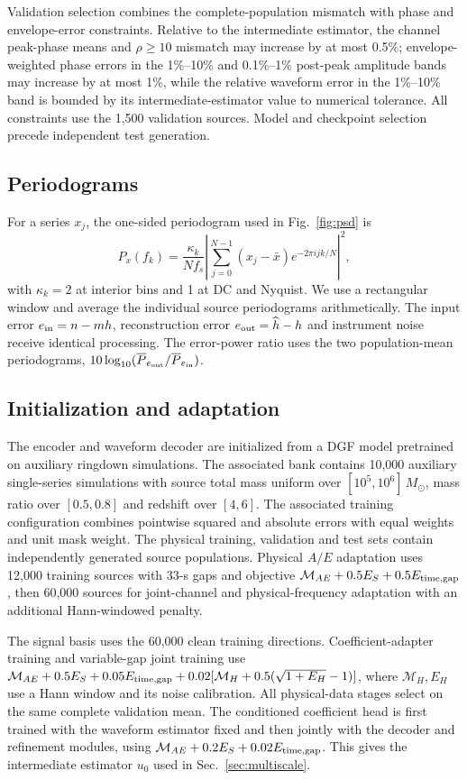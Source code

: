 \documentclass[10pt,prd,aps,a4paper,twocolumn,superscriptaddress,nofootinbib,floatfix]{revtex4-2}
\begin{document}
Validation selection combines the complete-population mismatch with phase and envelope-error constraints. Relative to the intermediate estimator, the channel peak-phase means and $\rho\ge10$ mismatch may increase by at most 0.5\%; envelope-weighted phase errors in the 1\%--10\% and 0.1\%--1\% post-peak amplitude bands may increase by at most 1\%, while the relative waveform error in the 1\%--10\% band is bounded by its intermediate-estimator value to numerical tolerance. All constraints use the 1,500 validation sources. Model and checkpoint selection precede independent test generation.

\subsection{Periodograms}
For a series $x_j$, the one-sided periodogram used in Fig.~\ref{fig:psd} is
\begin{equation}
P_x(f_k)=\frac{\kappa_k}{Nf_s}\left|\sum_{j=0}^{N-1}(x_j-\bar x)e^{-2\pi i jk/N}\right|^2,
\end{equation}
with $\kappa_k=2$ at interior bins and 1 at DC and Nyquist. We use a rectangular window and average the individual source periodograms arithmetically. The input error $e_{\rm in}=n-mh$, reconstruction error $e_{\rm out}=\widehat h-h$ and instrument noise receive identical processing. The error-power ratio uses the two population-mean periodograms, $10\log_{10}(\overline P_{e_{\rm out}}/\overline P_{e_{\rm in}})$.

\subsection{Initialization and adaptation}\label{app:initialization}
The encoder and waveform decoder are initialized from a DGF model pretrained on auxiliary ringdown simulations. The associated bank contains 10,000 auxiliary single-series simulations with source total mass uniform over $[10^5,10^6]\,M_\odot$, mass ratio over $[0.5,0.8]$ and redshift over $[4,6]$. The associated training configuration combines pointwise squared and absolute errors with equal weights and unit mask weight. The physical training, validation and test sets contain independently generated source populations. Physical $A/E$ adaptation uses 12,000 training sources with 33-s gaps and objective $\mathcal M_{AE}+0.5E_S+0.5E_{\rm time,gap}$, then 60,000 sources for joint-channel and physical-frequency adaptation with an additional Hann-windowed penalty.

The signal basis uses the 60,000 clean training directions. Coefficient-adapter training and variable-gap joint training use $\mathcal M_{AE}+0.5E_S+0.05E_{\rm time,gap}+0.02[\mathcal M_H+0.5(\sqrt{1+E_H}-1)]$, where $\mathcal M_H,E_H$ use a Hann window and its noise calibration. All physical-data stages select on the same complete validation mean. The conditioned coefficient head is first trained with the waveform estimator fixed and then jointly with the decoder and refinement modules, using $\mathcal M_{AE}+0.2E_S+0.02E_{\rm time,gap}$. This gives the intermediate estimator $u_0$ used in Sec.~\ref{sec:multiscale}.
\end{document}
